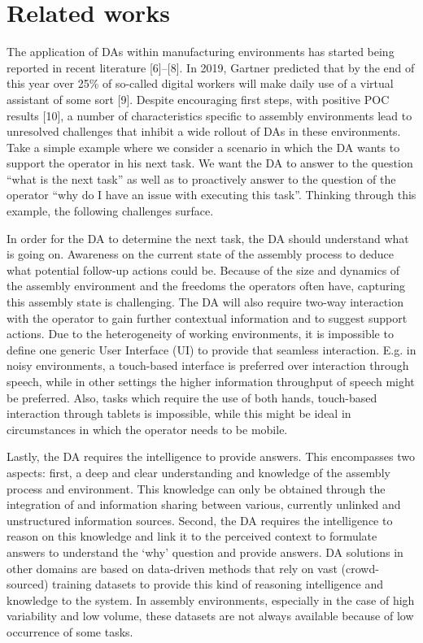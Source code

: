 \section{Related works}\label{sec:Literature}

The application of DAs within manufacturing environments has started being reported in recent literature [6]–[8]. In 2019, Gartner predicted that by the end of this year over 25\% of so-called digital workers will make daily use of a virtual assistant of some sort [9]. Despite encouraging first steps, with positive POC results [10], a number of characteristics specific to assembly environments lead to unresolved challenges that inhibit a wide rollout of DAs in these environments. Take a simple example where we consider a scenario in which the DA wants to support the operator in his next task. We want the DA to answer to the question “what is the next task” as well as to proactively answer to the question of the operator “why do I have an issue with executing this task”. Thinking through this example, the following challenges surface.

In order for the DA to determine the next task, the DA should understand what is going on. Awareness on the current state of the assembly process to deduce what potential follow-up actions could be. Because of the size and dynamics of the assembly environment and the freedoms the operators often have, capturing this assembly state is challenging. The DA will also require two-way interaction with the operator to gain further contextual information and to suggest support actions. Due to the heterogeneity of working environments, it is impossible to define one generic User Interface (UI) to provide that seamless interaction. E.g. in noisy environments, a touch-based interface is preferred over interaction through speech, while in other settings the higher information throughput of speech might be preferred. Also, tasks which require the use of both hands, touch-based interaction through tablets is impossible, while this might be ideal in circumstances in which the operator needs to be mobile.

Lastly, the DA requires the intelligence to provide answers. This encompasses two aspects: first, a deep and clear understanding and knowledge of the assembly process and environment. This knowledge can only be obtained through the integration of and information sharing between various, currently unlinked and unstructured information sources. Second, the DA requires the intelligence to reason on this knowledge and link it to the perceived context to formulate answers to understand the ‘why’ question and provide answers. DA solutions in other domains are based on data-driven methods that rely on vast (crowd-sourced) training datasets to provide this kind of reasoning intelligence and knowledge to the system. In assembly environments, especially in the case of high variability and low volume, these datasets are not always available because of low occurrence of some tasks.